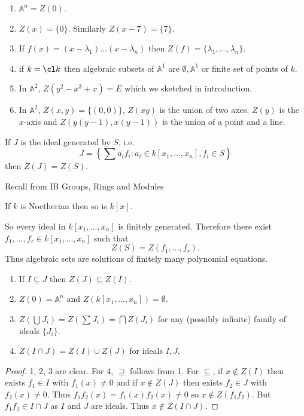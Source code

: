 \documentclass[a4paper]{article}
\renewcommand{\A}{\mathbb{A}}
\begin{document}
\begin{eg}\leavevmode
  \begin{enumerate}
  \item \(\A^n = Z(0)\).
  \item \(Z(x) = \{0\}\). Similarly \(Z(x - 7) = \{7\}\).
  \item If \(f(x) = (x - \lambda_1) \dots (x - \lambda_n)\) then \(Z(f) = \{\lambda_1, \dots, \lambda_n\}\).
  \item if \(k = \cl k\) then algebraic subsets of \(\A^1\) are \(\emptyset, \A^1\) or finite set of points of \(k\).
  \item In \(\A^2\), \(Z(y^2 - x^3 + x) = E\) which we sketched in introduction.
  \item In \(\A^2\), \(Z(x, y) = \{(0, 0)\}\), \(Z(xy)\) is the union of two axes. \(Z(y)\) is the \(x\)-axis and \(Z(y(y - 1), x(y - 1))\) is the union of a point and a line.
  \end{enumerate}
\end{eg}

If \(J\) is the ideal generated by \(S\), i.e.
\[
  J = \left\{\sum a_i f_i: a_i \in k[x_1, \dots, x_n], f_i \in S\right\}
\]
then \(Z(J) = Z(S)\).

Recall from IB Groups, Rings and Modules

\begin{theorem}
  If \(k\) is Noetherian then so is \(k[x]\).
\end{theorem}

So every ideal in \(k[x_1, \dots, x_n]\) is finitely generated. Therefore there exist \(f_1, \dots, f_r \in k[x_1, \dots, x_n]\) such that
\[
  Z(S) = Z(f_1, \dots, f_r).
\]
Thus algebraic sets are solutions of finitely many polynomial equations.

\begin{lemma}\leavevmode
  \begin{enumerate}
  \item If \(I \subseteq J\) then \(Z(J) \subseteq Z(I)\).
  \item \(Z(0) = \A^n\) and \(Z(k[x_1, \dots, x_n]) = \emptyset\).
  \item \(Z(\bigcup J_i) = Z(\sum J_i) = \bigcap Z(J_i)\) for any (possibly infinite) family of ideals \(\{J_i\}\).
  \item \(Z(I \cap J) = Z(I) \cup Z(J)\) for ideals \(I, J\).
  \end{enumerate}
\end{lemma}

\begin{proof}
  1, 2, 3 are clear. For 4, \(\supseteq\) follows from 1. For \(\subseteq\), if \(x \notin Z(I)\) then exists \(f_1 \in I\) with \(f_1(x) \neq 0\) and if \(x \notin Z(J)\) then exists \(f_2 \in J\) with \(f_2(x) \neq 0\). Thus \(f_1f_2(x) = f_1(x)f_2(x) \neq 0\) so \(x \notin Z(f_1f_2)\). But \(f_1f_2 \in I \cap J\) as \(I\) and \(J\) are ideals. Thus \(x \notin Z(I \cap J)\).
\end{proof}
\end{document}
